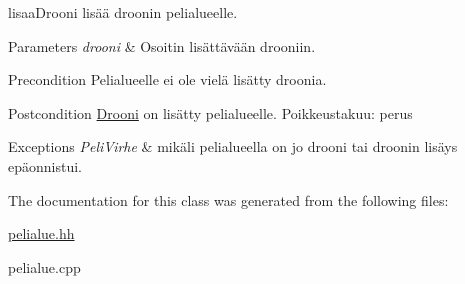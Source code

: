 lisaa\-Drooni lisää droonin pelialueelle. 


\begin{DoxyParams}{Parameters}
{\em drooni} & Osoitin lisättävään drooniin. \\
\hline
\end{DoxyParams}
\begin{DoxyPrecond}{Precondition}
Pelialueelle ei ole vielä lisätty droonia. 
\end{DoxyPrecond}
\begin{DoxyPostcond}{Postcondition}
\hyperlink{class_drooni}{Drooni} on lisätty pelialueelle. Poikkeustakuu\-: perus 
\end{DoxyPostcond}

\begin{DoxyExceptions}{Exceptions}
{\em Peli\-Virhe} & mikäli pelialueella on jo drooni tai droonin lisäys epäonnistui. \\
\hline
\end{DoxyExceptions}


The documentation for this class was generated from the following files\-:\begin{DoxyCompactItemize}
\item 
\hyperlink{pelialue_8hh}{pelialue.\-hh}\item 
pelialue.\-cpp\end{DoxyCompactItemize}
